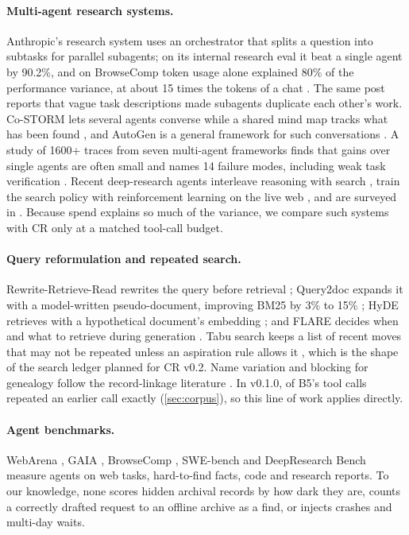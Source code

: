 \paragraph{Multi-agent research systems.} Anthropic's research system uses an orchestrator that splits a question into subtasks for parallel subagents; on its internal research eval it beat a single agent by 90.2\%, and on BrowseComp token usage alone explained 80\% of the performance variance, at about 15 times the tokens of a chat \citep{anthropic2025multiagent}. The same post reports that vague task descriptions made subagents duplicate each other's work. Co-STORM lets several agents converse while a shared mind map tracks what has been found \citep{jiang2024costorm}, and AutoGen is a general framework for such conversations \citep{wu2023autogen}. A study of 1600+ traces from seven multi-agent frameworks finds that gains over single agents are often small and names 14 failure modes, including weak task verification \citep{cemri2025mast}. Recent deep-research agents interleave reasoning with search \citep{li2025searcho1,li2025webthinker}, train the search policy with reinforcement learning on the live web \citep{zheng2025deepresearcher}, and are surveyed in \citet{huang2025drsurvey}. Because spend explains so much of the variance, we compare such systems with CR only at a matched tool-call budget.

\paragraph{Query reformulation and repeated search.} Rewrite-Retrieve-Read rewrites the query before retrieval \citep{ma2023rewrite}; Query2doc expands it with a model-written pseudo-document, improving BM25 by 3\% to 15\% \citep{wang2023query2doc}; HyDE retrieves with a hypothetical document's embedding \citep{gao2022hyde}; and FLARE decides when and what to retrieve during generation \citep{jiang2023flare}. Tabu search keeps a list of recent moves that may not be repeated unless an aspiration rule allows it \citep{glover1997tabu}, which is the shape of the search ledger planned for CR v0.2. Name variation and blocking for genealogy follow the record-linkage literature \citep{christen2012datamatching}. In v0.1.0,  of B5's tool calls repeated an earlier call exactly (\cref{sec:corpus}), so this line of work applies directly.

\paragraph{Agent benchmarks.} WebArena \citep{zhou2024webarena}, GAIA \citep{mialon2024gaia}, BrowseComp \citep{wei2025browsecomp}, SWE-bench \citep{jimenez2024swebench} and DeepResearch Bench \citep{du2025deepresearchbench} measure agents on web tasks, hard-to-find facts, code and research reports. To our knowledge, none scores hidden archival records by how dark they are, counts a correctly drafted request to an offline archive as a find, or injects crashes and multi-day waits.

